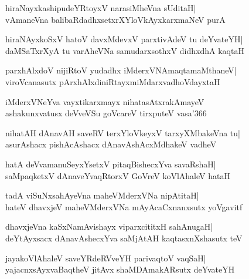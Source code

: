 \documentclass[twoside,12pt,openright]{book}
\newcounter{shloka}[chapter]
\begin{document}
\begin{shloka}%
hiraNayxkashipudeYRtoyxV narasiMheVna sUditaH|\\
vAmaneVna balibaRdadhxsetxrXYloVkAyxkarxmaNeV purA
\end{shloka}

\begin{shloka}%
hiraNAyxkoSxV hatoV davxMdevxV parxtivAdeV tu deYvateYH|\\
daMSaTxrXyA tu varAheVNa samudarxsothxV didhxdhA kaqtaH
\end{shloka}

\begin{shloka}%
parxhAlxdoV nijiRtoV yudadhx iMderxVNAmaqtamaMthaneV|\\
viroVcanasutx pArxhAlxdiniRtayxmiMdarxvadhoVdayxtaH
\end{shloka}

\begin{shloka}%
iMderxVNeYva vayxtikarxmayx nihatasAtxrakAmayeV\\
ashakunxvatusx deVveVSu goVcareV tirxputeV vasa\char'366
\end{shloka}

\begin{shloka}%
nihatAH dAnavAH saveRV terxYloVkeyxV tarxyXMbakeVna tu|\\
asurAshacx pishAcAshacx dAnavAshAcxMdhakeV vadheV
\end{shloka}

\begin{shloka}%
hatA deVvamanuSeyxYsetxV pitaqBishecxYva savaRshaH|\\
saMpaqketxV dAnaveYvaqRtorxV GoVreV koVlAhaleV hataH
\end{shloka}

\begin{shloka}%
tadA viSuNxsahAyeVna maheVMderxVNa nipAtitaH|\\
hateV dhavxjeV maheVMderxVNa mAyAcaCxnanxsutx yoVgavitf
\end{shloka}

\begin{shloka}%
dhavxjeVna kaSxNamAvishayx viparxcititxH sahAnugaH|\\
deYtAyxsacx dAnavAshecxYva saMjAtAH kaqtasxnXshasutx teV
\end{shloka}

\begin{shloka}%
jayakoVlAhaleV saveYRdeRVveYH parivaqtoV vaqSaH|\\
yajacnxsAyxvaBaqtheV jitAvx shaMDAmakARsutx deYvateYH
\end{shloka}
\end{document}
